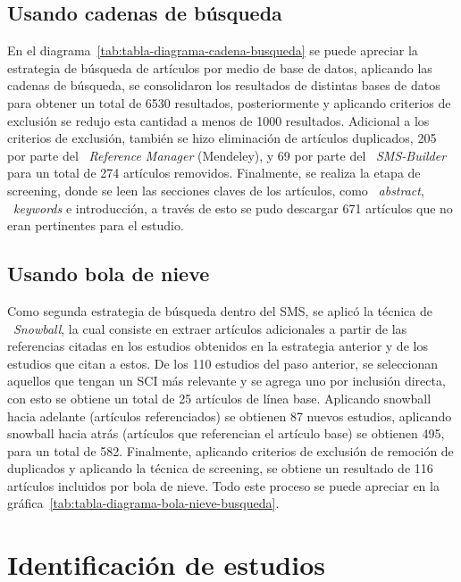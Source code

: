 \subsection{Usando cadenas de búsqueda}
En el diagrama~\ref{tab:tabla-diagrama-cadena-busqueda} se puede apreciar la estrategia de búsqueda de artículos por medio de base de datos, aplicando las cadenas de búsqueda, se consolidaron los resultados de distintas bases de datos para obtener un total de 6530 resultados, posteriormente y aplicando criterios de exclusión se redujo esta cantidad a menos de 1000 resultados. Adicional a los criterios de exclusión, también se hizo eliminación de artículos duplicados, 205 por parte del ~\textit{Reference Manager} (Mendeley), y 69 por parte del ~\textit{SMS-Builder} para un total de 274 artículos removidos. Finalmente, se realiza la etapa de screening, donde se leen las secciones claves de los artículos, como ~\textit{abstract}, ~\textit{keywords} e introducción, a través de esto se pudo descargar 671 artículos que no eran pertinentes para el estudio.
\label{img:busqueda-bd}

\subsection{Usando bola de nieve}
Como segunda estrategia de búsqueda dentro del SMS, se aplicó la técnica de ~\textit{Snowball}, la cual consiste en extraer artículos adicionales a partir de las referencias citadas en los estudios obtenidos en la estrategia anterior y de los estudios que citan a estos. De los 110 estudios del paso anterior, se seleccionan aquellos que tengan un SCI más relevante y se agrega uno por inclusión directa, con esto se obtiene un total de 25 artículos de línea base. Aplicando snowball hacia adelante (artículos referenciados) se obtienen 87 nuevos estudios, aplicando snowball hacia atrás (artículos que referencian el artículo base) se obtienen 495, para un total de 582. Finalmente, aplicando criterios de exclusión de remoción de duplicados y aplicando la técnica de screening, se obtiene un resultado de 116 artículos incluidos por bola de nieve. Todo este proceso se puede apreciar en la gráfica~\ref{tab:tabla-diagrama-bola-nieve-busqueda}.


\section{Identificación de estudios}

